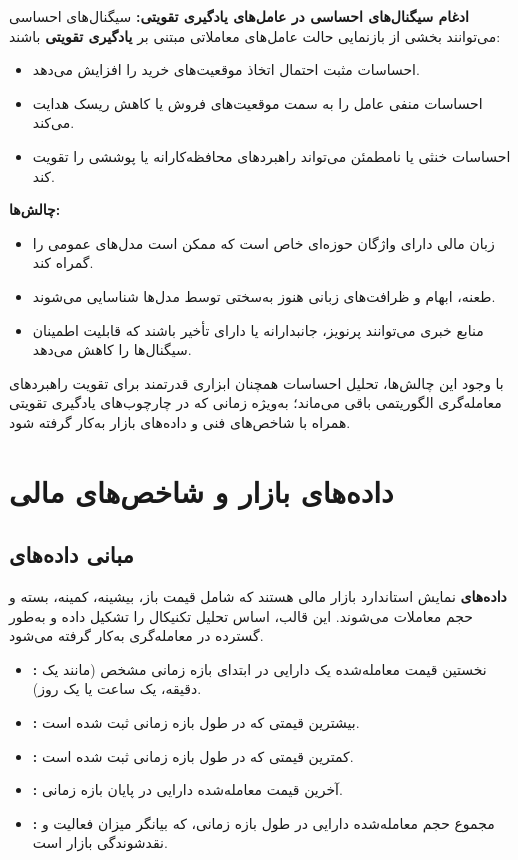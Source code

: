 \documentclass[12pt, a4paper]{report}
\begin{document}
\bigskip

\textbf{ادغام سیگنال‌های احساسی در عامل‌های یادگیری تقویتی:}  
سیگنال‌های احساسی می‌توانند بخشی از بازنمایی حالت عامل‌های معاملاتی مبتنی بر \textbf{یادگیری تقویتی} باشند:  
\begin{itemize}
    \item احساسات مثبت احتمال اتخاذ موقعیت‌های خرید  را افزایش می‌دهد.  
    \item احساسات منفی عامل را به سمت موقعیت‌های فروش  یا کاهش ریسک هدایت می‌کند.  
    \item احساسات خنثی یا نامطمئن می‌تواند راهبردهای محافظه‌کارانه یا پوششی  را تقویت کند.  
\end{itemize}

\bigskip
\textbf{چالش‌ها:}
\begin{itemize}
    \item زبان مالی دارای واژگان حوزه‌ای خاص است که ممکن است مدل‌های عمومی را گمراه کند.  
    \item طعنه، ابهام و ظرافت‌های زبانی هنوز به‌سختی توسط مدل‌ها شناسایی می‌شوند.  
    \item منابع خبری می‌توانند پرنویز، جانبدارانه یا دارای تأخیر باشند که قابلیت اطمینان سیگنال‌ها را کاهش می‌دهد.  
\end{itemize}

با وجود این چالش‌ها، تحلیل احساسات همچنان ابزاری قدرتمند برای تقویت راهبردهای معامله‌گری الگوریتمی باقی می‌ماند؛ به‌ویژه زمانی که در چارچوب‌های یادگیری تقویتی همراه با شاخص‌های فنی و داده‌های بازار به‌کار گرفته شود.  


\section{داده‌های بازار و شاخص‌های مالی}

\subsection{مبانی داده‌های \protect\footnotemark}

\textbf{داده‌های } نمایش استاندارد بازار مالی هستند که شامل قیمت باز، بیشینه، کمینه، بسته و حجم معاملات می‌شوند. این قالب، اساس تحلیل تکنیکال را تشکیل داده و به‌طور گسترده در معامله‌گری به‌کار گرفته می‌شود.  

\begin{itemize}
    \item \textbf{:} نخستین قیمت معامله‌شده یک دارایی در ابتدای بازه زمانی مشخص (مانند یک دقیقه، یک ساعت یا یک روز).  
    \item \textbf{:} بیشترین قیمتی که در طول بازه زمانی ثبت شده است.  
    \item \textbf{:} کمترین قیمتی که در طول بازه زمانی ثبت شده است.  
    \item \textbf{:} آخرین قیمت معامله‌شده دارایی در پایان بازه زمانی.  
    \item \textbf{:} مجموع حجم معامله‌شده دارایی در طول بازه زمانی، که بیانگر میزان فعالیت و نقدشوندگی بازار است.  
\end{itemize}
\end{document}
